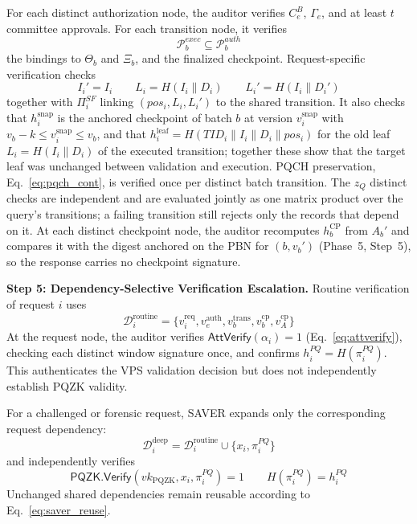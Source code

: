\documentclass[lettersize,journal]{IEEEtran}
\begin{document}
For each distinct authorization node, the auditor verifies $C_e^B$,
$\Gamma_e$, and at least $t$ committee approvals. For each transition
node, it verifies
\begin{equation}
\mathcal{P}_b^{exec}\subseteq\mathcal{P}_b^{auth}
\end{equation}
the bindings to $\Theta_b$ and $\Xi_b$, and the finalized checkpoint.
Request-specific verification checks
\begin{equation}
I_i'=I_i\qquad
L_i=H(I_i\parallel D_i)\qquad
L_i'=H(I_i\parallel D_i')
\end{equation}
together with $\Pi_i^{SF}$ linking
$(pos_i,L_i,L_i')$ to the shared transition.
It also checks that $h_i^{\mathrm{snap}}$ is the anchored
checkpoint of batch $b$ at version $v_i^{\mathrm{snap}}$ with
$v_b-k\le v_i^{\mathrm{snap}}\le v_b$, and that
$h_i^{\mathrm{leaf}}=H(TID_i\parallel I_i\parallel D_i\parallel pos_i)$
for the old leaf $L_i=H(I_i\parallel D_i)$ of the executed transition;
together these show that the target leaf was unchanged between validation
and execution. PQCH preservation, Eq.~\eqref{eq:pqch_cont}, is
verified once per distinct batch transition.
The $z_Q$ distinct checks are independent and are
evaluated jointly as one matrix product over the query's transitions; a
failing transition still rejects only the records that depend on it. At
each distinct checkpoint node, the auditor recomputes $h_b^{\mathrm{CP}}$
from $A_b'$ and compares it with the digest anchored on the PBN for
$(b,v_b')$ (Phase~5, Step~5), so the response carries no checkpoint
signature.

\medskip
\noindent\textbf{Step 5: Dependency-Selective Verification Escalation.}
Routine verification of request $i$ uses
\begin{equation}
\mathcal{D}_i^{\mathrm{routine}}
=
\{
v_i^{\mathrm{req}},
v_e^{\mathrm{auth}},
v_b^{\mathrm{trans}},
v_b^{\mathrm{cp}},
v_A^{\mathrm{cp}}
\}
\end{equation}
At the request node, the auditor verifies
$\mathsf{AttVerify}(\alpha_i)=1$
(Eq.~\eqref{eq:attverify}), checking each distinct window signature
once,
and confirms $h_i^{PQ}=H(\pi_i^{PQ})$. This authenticates the VPS
validation decision but does not independently establish PQZK validity.

For a challenged or forensic request, SAVER expands only the
corresponding request dependency:
\begin{equation}
\mathcal{D}_i^{\mathrm{deep}}
=
\mathcal{D}_i^{\mathrm{routine}}
\cup
\{x_i,\pi_i^{PQ}\}
\end{equation}
and independently verifies
\begin{equation}
\mathsf{PQZK.Verify}
(vk_{\mathrm{PQZK}},x_i,\pi_i^{PQ})=1
\qquad
H(\pi_i^{PQ})=h_i^{PQ}
\end{equation}
Unchanged shared dependencies remain reusable according to
Eq.~\eqref{eq:saver_reuse}.
\end{document}
